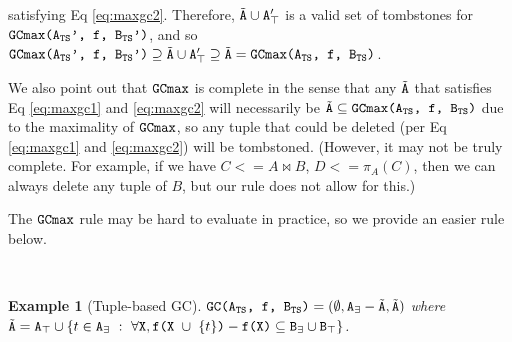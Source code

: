 \documentclass[10pt]{proc}
\newtheorem{example}{Example}[section]
\renewcommand{\tt}[1]{\ifmmode\text{\texttt{#1}}\else\texttt{#1}\fi}
\begin{document}
satisfying Eq \eqref{eq:maxgc2}.
Therefore, $\tilde{\tt{A}} \cup \tt{A}_\top'$ is a valid set of tombstones for $\tt{GCmax(A$_\text{TS}$', f, B$_\text{TS}$')}$, and so $\tt{GCmax(A$_\text{TS}$', f, B$_\text{TS}$')} \supseteq \tilde{\tt{A}} \cup \tt{A}_\top' \supseteq \tilde{\tt{A}} = \tt{GCmax(A$_\text{TS}$, f, B$_\text{TS}$)}$.

We also point out that $\tt{GCmax}$ is complete in the sense that any $\tilde{\tt{A}}$ that satisfies Eq \eqref{eq:maxgc1} and \eqref{eq:maxgc2} will necessarily be $\tilde{\tt{A}} \subseteq \tt{GCmax(A$_\text{TS}$, f, B$_\text{TS}$)}$ due to the maximality of $\tt{GCmax}$, so any tuple that could be deleted (per Eq \eqref{eq:maxgc1} and \eqref{eq:maxgc2}) will be tombstoned.
(However, it may not be truly complete. For example, if we have $C <= A \Join B$, $D <= \pi_A(C)$, then we can always delete any tuple of $B$, but our rule does not allow for this.)

The $\tt{GCmax}$ rule may be hard to evaluate in practice, so we provide an easier rule below.

~

\begin{example}[Tuple-based GC]
$\tt{GC(A$_\text{TS}$, f, B$_\text{TS}$)} = (\emptyset, \tt{A}_\exists - \tilde{\tt{A}}, \tilde{\tt{A}})$ where $\tilde{\tt{A}} = \tt{A}_\top \cup \{t \in \tt{A}_\exists ~:~ \forall \tt{X}, \tt{f(X $\cup$ $\{t\}$)} - \tt{f(X)} \subseteq \tt{B}_\exists \cup \tt{B}_\top\}$.
\end{example}
\end{document}
